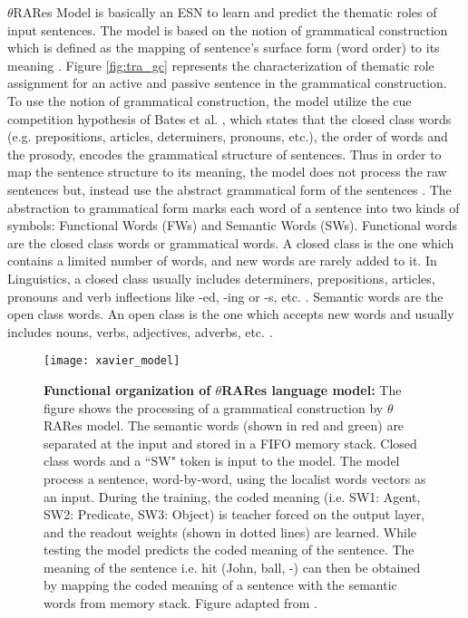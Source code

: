 $\theta$RARes Model is basically an ESN to learn and predict the thematic roles of input sentences. The model is based on the notion of grammatical construction \cite{gc:goldberg:1995} which is defined as the mapping of sentence's surface form (word order) to its meaning \cite{xavier:2013:RT}. Figure \ref{fig:tra_gc} represents the characterization of thematic role assignment for an active and passive sentence in the grammatical construction. To use the notion of grammatical construction, the model utilize the cue competition hypothesis of Bates et al. \cite{tra:bates:1982}, which states that the closed class words (e.g. prepositions, articles, determiners, pronouns, etc.), the order of words and the prosody, encodes the grammatical structure of sentences. Thus in order to map the sentence structure to its meaning, the model does not process the raw sentences but, instead use the abstract grammatical form of the sentences \cite{xavier:2013:RT, tra:dominey:2003}. The abstraction to grammatical form marks each word of a sentence into two kinds of symbols: Functional Words (FWs) and Semantic Words (SWs). Functional words are the closed class words or grammatical words. A closed class is the one which contains a limited number of words, and new words are rarely added to it. In Linguistics, a closed class usually includes determiners, prepositions, articles, pronouns and verb inflections like -ed, -ing or -s, etc. \cite{tra:open_close_class}. Semantic words are the open class words. An open class is the one which accepts new words and usually includes nouns, verbs, adjectives, adverbs, etc. \cite{tra:open_close_class}. 

\begin{figure}[hbtp]
\centering
\texttt{[image: xavier\_model]}
\caption[Functional organization of $\theta$RARes language model.]{\textbf{Functional organization of $\theta$RARes language model: }{\small The figure shows the processing of a grammatical construction by $\theta$RARes model. The semantic words (shown in red and green) are separated at the input and stored in a FIFO memory stack. Closed class words and a ``SW" token is input to the model. The model process a sentence, word-by-word, using the localist words vectors as an input. During the training, the coded meaning (i.e. SW1: Agent, SW2: Predicate, SW3: Object) is teacher forced on the output layer, and the readout weights (shown in dotted lines) are learned. While testing the model predicts the coded meaning of the sentence. The meaning of the sentence i.e. hit (John, ball, -) can then be obtained by mapping the coded meaning of a sentence with the semantic words from memory stack. Figure adapted from \cite{xavier:2013:RT}.} }
\label{fig:xavier_model}
\end{figure}

